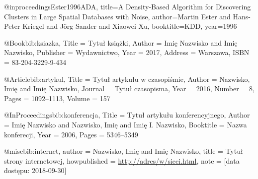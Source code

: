 @inproceedings{Ester1996ADA,
  title={A Density-Based Algorithm for Discovering Clusters in Large Spatial Databases with Noise},
  author={Martin Ester and Hans-Peter Kriegel and J{\"o}rg Sander and Xiaowei Xu},
  booktitle={KDD},
  year={1996}
}

@Book{bib:ksiazka,
Title                    = {Tytu{\l} ksi{\k{a}}{\.{z}}ki},
Author                   = {Imi{\k{e}} Nazwisko and Imi{\k{e}} Nazwisko},
Publisher                = {Wydawnictwo},
Year                     = {2017},
Address                  = {Warszawa},
ISBN                     = {83-204-3229-9-434}
}

@Article{bib:artykul,
Title                    = {Tytu{\l} artyku{\l}u w czasopi{\'{s}}mie},
Author                   = {Nazwisko, Imi{\k{e}} and Imi{\k{e}} Nazwisko},
Journal                  = {Tytu{\l} czasopisma},
Year                     = {2016},
Number                   = {8},
Pages                    = {1092--1113},
Volume                   = {157}
}

@InProceedings{bib:konferencja,
  Title                    = {Tytu{\l} artyku{\l}u konferencyjnego},
  Author                   = {Imi{\k{e}} Nazwisko and Nazwisko, Imi{\k{e}} and Imi{\k{e}} I. Nazwisko},
  Booktitle                = {Nazwa konferecji},
  Year                     = {2006},
  Pages                    = {5346--5349}
}

@misc{bib:internet,
  author = {Nazwisko, Imi{\k{e}} and Imi{\k{e}} Nazwisko},
  title = {Tytu{\l} strony internetowej},
  howpublished = {\url{http://adres/w/sieci.html}},
  note = {[data dostępu: 2018-09-30]}
}

